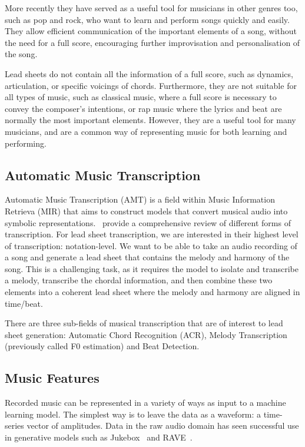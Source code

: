 More recently they have served as a useful tool for musicians in other genres too, such as pop and rock, who want to learn and perform songs quickly and easily. They allow efficient communication of the important elements of a song, without the need for a full score, encouraging further improvisation and personalisation of the song.

Lead sheets do not contain all the information of a full score, such as dynamics, articulation, or specific voicings of chords. Furthermore, they are not suitable for all types of music, such as classical music, where a full score is necessary to convey the composer's intentions, or rap music where the lyrics and beat are normally the most important elements. However, they are a useful tool for many musicians, and are a common way of representing music for both learning and performing.

\subsection{Automatic Music Transcription}

Automatic Music Transcription (AMT) is a field within Music Information Retrieva (MIR) that aims to construct models that convert musical audio into symbolic representations.~\citep{ComprehensiveReviewMusicTranscription} provide a comprehensive review of different forms of transcription. For lead sheet transcription, we are interested in their highest level of transcription: notation-level. We want to be able to take an audio recording of a song and generate a lead sheet that contains the melody and harmony of the song. This is a challenging task, as it requires the model to isolate and transcribe a melody, transcribe the chordal information, and then combine these two elements into a coherent lead sheet where the melody and harmony are aligned in time/beat.

There are three sub-fields of musical transcription that are of interest to lead sheet generation: Automatic Chord Recognition (ACR), Melody Transcription (previously called F0 estimation) and Beat Detection.

\subsection{Music Features}

Recorded music can be represented in a variety of ways as input to a machine learning model. The simplest way is to leave the data as a waveform: a time-series vector of amplitudes. Data in the raw audio domain has seen successful use in generative models such as Jukebox~\citep{Jukebox} and RAVE~\citep{RAVE}.

